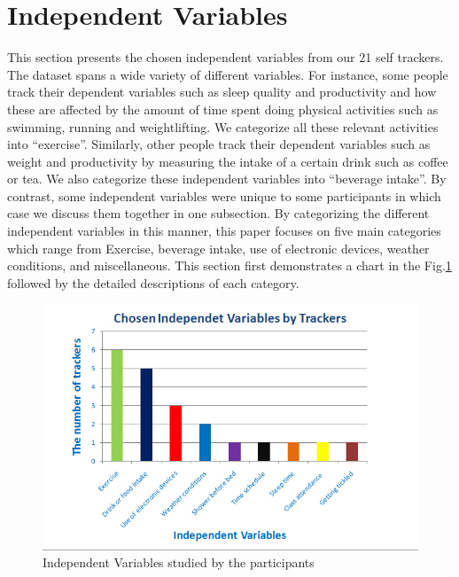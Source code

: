 \section{Independent Variables}

This section presents the chosen independent variables from our 21 self trackers. The dataset spans a wide variety of different variables. For instance, some people track their dependent variables such as sleep quality and productivity and how these are affected by the amount of time spent doing physical activities such as swimming, running and weightlifting. We categorize all these relevant activities into \enquote{exercise}. Similarly, other people track their dependent variables such as weight and productivity by measuring the intake of a certain drink such as coffee or tea. We also categorize these independent variables into \enquote{beverage intake}. By contrast, some independent variables were unique to some participants in which case we discuss them together in one subsection. By categorizing the different independent variables in this manner, this paper focuses on five main categories which range from Exercise, beverage intake, use of electronic devices, weather conditions, and miscellaneous. This section first demonstrates a chart in the Fig.\ref{fig:chart} followed by the detailed descriptions of each category. 

\begin{figure}[!t]\centering
\includegraphics[width=1.0\columnwidth]{images/independent_variables.jpg}
\caption{\footnotesize Independent Variables studied by the participants \label{fig:chart} 
}%
\end{figure}

